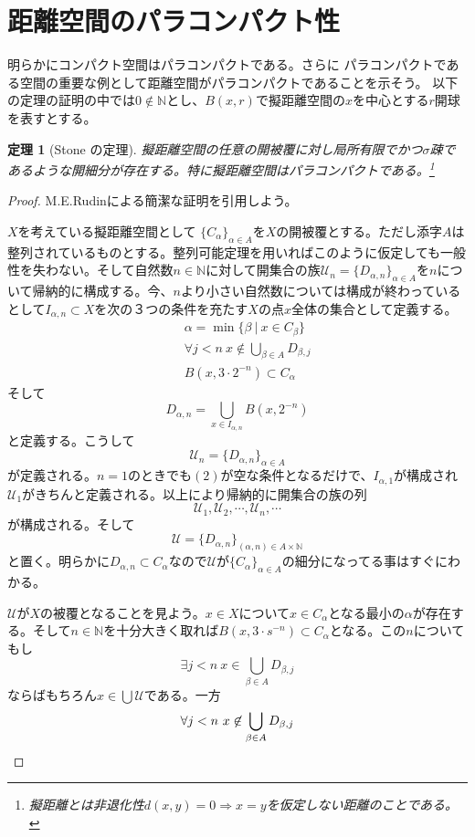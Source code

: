 \documentclass[leqno]{jsarticle}
\newtheorem{thm}{定理}
\newcommand{\To}{\Longrightarrow}
\newcommand{\nn}{\mathbb{N}}
\newcommand{\al}{\alpha}
\newcommand{\be}{\beta}
\begin{document}
\section{距離空間のパラコンパクト性}
\setcounter{equation}{0}明らかにコンパクト空間はパラコンパクトである。さらに
パラコンパクトである空間の重要な例として距離空間がパラコンパクトであることを示そう。
以下の定理の証明の中では$0\not\in \nn$とし、$B(x,r)$で擬距離空間の$x$を中心とする$r$開球を表すとする。
\begin{thm}[Stone の定理]
擬距離空間の任意の開被覆に対し局所有限でかつ$\sigma$疎であるような開細分が存在する。特に擬距離空間はパラコンパクトである。\footnote{擬距離とは非退化性$d(x,y)=0\To x=y$を仮定しない距離のことである。}
\end{thm}
\begin{proof}M.E.Rudinによる簡潔な証明\cite{5}を引用しよう。\par 
$X$を考えている擬距離空間として
$\{C_{\al}\}_{\al\in A}$を$X$の開被覆とする。ただし添字$A$は整列されているものとする。整列可能定理を用いればこのように仮定しても一般性を失わない。そして自然数$n\in \nn$に対して開集合の族$\mathcal{U}_n=\{D_{\al,n}\}_{\al\in A}$を$n$について帰納的に構成する。今、$n$より小さい自然数については構成が終わっているとして$I_{\al,n}\subset X$を次の３つの条件を充たす$X$の点$x$全体の集合として定義する。
\begin{eqnarray}
&&\al =\min \{\be \ |\ x\in C_\be \}\\
&&\forall j<n\ x\not\in \bigcup_{\be \in A}D_{\be,j}\\ 
&&B(x,3\cdot2^{-n})\subset C_{\al}
\end{eqnarray}
そして
\[
D_{\al,n}=\bigcup_{x\in I_{\al,n}}B(x,2^{-n})
\]
と定義する。こうして
\[
\mathcal{U}_n=\{D_{\al,n}\}_{\al\in A}
\]
が定義される。$n=1$のときでも$(2)$が空な条件となるだけで、$I_{\al,1}$が構成され$\mathcal{U}_1$がきちんと定義される。以上により帰納的に開集合の族の列
\[
\mathcal{U}_1,\mathcal{U}_2,\cdots ,\mathcal{U}_n,\cdots
\]
が構成される。そして
\[
\mathcal{U}=\{D_{\al,n}\}_{(\al,n)\in A\times \nn}
\]
と置く。明らかに$D_{\al,n}\subset C_{\al}$なので$\mathcal{U}$が$\{C_{\al}\}_{\al\in A}$の細分になってる事はすぐにわかる。\par 
$\mathcal{U}$が$X$の被覆となることを見よう。$x\in X$について$x\in C_{\al}$となる最小の$\al$が存在する。そして$n\in\nn$を十分大きく取れば$B(x,3\cdot s^{-n})\subset C_{\al}$となる。この$n$についてもし
\[
\exists j<n\ x\in \bigcup_{\be \in A}D_{\be,j}
\]
ならばもちろん$x\in \bigcup \mathcal{U}$である。一方
\[
\forall j<n\ x\not\in \bigcup_{\be \in A}D_{\be,j}\\ 
\]
\end{proof}
\end{document}
